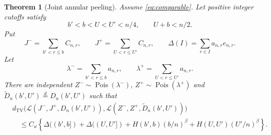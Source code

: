 \documentclass[11pt]{article}
\numberwithin{equation}{section}
\newcommand{\Pois}{\operatorname{Pois}}
\newcommand{\TV}{d_{\mathrm{TV}}}
\newcommand{\cL}{\mathcal L}
\newtheorem{theorem}{Theorem}[section]
\theoremstyle{definition}
\theoremstyle{remark}
\begin{document}
\begin{theorem}[Joint annular peeling]\label{lem:annular}
Assume \eqref{eq:comparable}.  Let positive integer cutoffs satisfy
\[
 b'<b<U<U'<n/4,\qquad U+b<n/2.
\]
Put
\[
 J^- =\sum_{b'<r\le b}C_{n,r},\qquad
 J^+ =\sum_{U<r\le U'}C_{n,r},\qquad
 \Delta(I)=\sum_{r\in I}a_{n,r}e_{n,r}.
\]
Let
\[
 \lambda^- =\sum_{b'<r\le b}a_{n,r},\qquad
 \lambda^+ =\sum_{U<r\le U'}a_{n,r}.
\]
There are independent $Z^-\sim\Pois(\lambda^-)$,
$Z^+\sim\Pois(\lambda^+)$ and
$\widetilde D_n(b',U')\overset d=D_n(b',U')$ such that
\begin{equation}\label{eq:annular-error}
\begin{split}
 &\TV\bigl(\cL(J^-,J^+,D_n(b',U')),
       \cL(Z^-,Z^+,\widetilde D_n(b',U'))\bigr)\\
 &\quad\le C_\varkappa\left\{
 \Delta((b',b])+\Delta((U,U'])
 +H(b',b)(b/n)^\beta+H(U,U')(U'/n)^\beta\right\}.
\end{split}
\end{equation}
\end{theorem}
\end{document}
